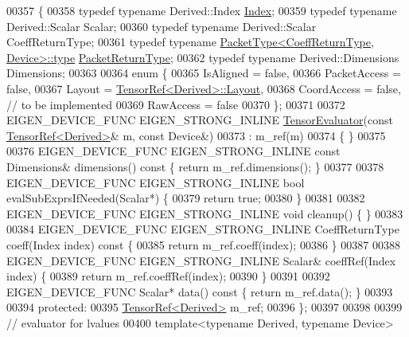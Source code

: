 \begin{DoxyCode}
00357 \{
00358   \textcolor{keyword}{typedef} \textcolor{keyword}{typename} Derived::Index \hyperlink{namespace_eigen_a62e77e0933482dafde8fe197d9a2cfde}{Index};
00359   \textcolor{keyword}{typedef} \textcolor{keyword}{typename} Derived::Scalar Scalar;
00360   \textcolor{keyword}{typedef} \textcolor{keyword}{typename} Derived::Scalar CoeffReturnType;
00361   \textcolor{keyword}{typedef} \textcolor{keyword}{typename} \hyperlink{group___sparse_core___module}{PacketType<CoeffReturnType, Device>::type} 
      \hyperlink{group___sparse_core___module}{PacketReturnType};
00362   \textcolor{keyword}{typedef} \textcolor{keyword}{typename} Derived::Dimensions Dimensions;
00363 
00364   \textcolor{keyword}{enum} \{
00365     IsAligned = \textcolor{keyword}{false},
00366     PacketAccess = \textcolor{keyword}{false},
00367     Layout = \hyperlink{class_eigen_1_1_tensor_ref}{TensorRef<Derived>::Layout},
00368     CoordAccess = \textcolor{keyword}{false},  \textcolor{comment}{// to be implemented}
00369     RawAccess = \textcolor{keyword}{false}
00370   \};
00371 
00372   EIGEN\_DEVICE\_FUNC EIGEN\_STRONG\_INLINE \hyperlink{struct_eigen_1_1_tensor_evaluator}{TensorEvaluator}(\textcolor{keyword}{const} 
      \hyperlink{class_eigen_1_1_tensor_ref}{TensorRef<Derived>}& m, \textcolor{keyword}{const} Device&)
00373       : m\_ref(m)
00374   \{ \}
00375 
00376   EIGEN\_DEVICE\_FUNC EIGEN\_STRONG\_INLINE \textcolor{keyword}{const} Dimensions& dimensions()\textcolor{keyword}{ const }\{ \textcolor{keywordflow}{return} m\_ref.dimensions(); \}
00377 
00378   EIGEN\_DEVICE\_FUNC EIGEN\_STRONG\_INLINE \textcolor{keywordtype}{bool} evalSubExprsIfNeeded(Scalar*) \{
00379     \textcolor{keywordflow}{return} \textcolor{keyword}{true};
00380   \}
00381 
00382   EIGEN\_DEVICE\_FUNC EIGEN\_STRONG\_INLINE \textcolor{keywordtype}{void} cleanup() \{ \}
00383 
00384   EIGEN\_DEVICE\_FUNC EIGEN\_STRONG\_INLINE CoeffReturnType coeff(Index index)\textcolor{keyword}{ const }\{
00385     \textcolor{keywordflow}{return} m\_ref.coeff(index);
00386   \}
00387 
00388   EIGEN\_DEVICE\_FUNC EIGEN\_STRONG\_INLINE Scalar& coeffRef(Index index) \{
00389     \textcolor{keywordflow}{return} m\_ref.coeffRef(index);
00390   \}
00391 
00392   EIGEN\_DEVICE\_FUNC Scalar* data()\textcolor{keyword}{ const }\{ \textcolor{keywordflow}{return} m\_ref.data(); \}
00393 
00394  \textcolor{keyword}{protected}:
00395   \hyperlink{class_eigen_1_1_tensor_ref}{TensorRef<Derived>} m\_ref;
00396 \};
00397 
00398 
00399 \textcolor{comment}{// evaluator for lvalues}
00400 \textcolor{keyword}{template}<\textcolor{keyword}{typename} Derived, \textcolor{keyword}{typename} Device>

\end{DoxyCode}
